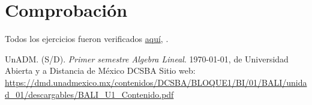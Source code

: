\documentclass[12pt]{article}
\begin{document}
\section*{Comprobaci\'on}
	\par Todos los ejercicios fueron verificados \href{https://github.com/BenchHPZ/UnADM-Biotecnologia/blob/master/B1-1/AL/Actividades/BALI_U2_A2_BERC.ipynb}{aqu\'i}, .



\newpage
\begin{thebibliography}{X}
	 UnADM. (S/D). \emph{Primer semestre Algebra Lineal}. \today, de Universidad Abierta y a Distancia de México \textbar{} DCSBA
Sitio web:
\url{https://dmd.unadmexico.mx/contenidos/DCSBA/BLOQUE1/BI/01/BALI/unidad_01/descargables/BALI_U1_Contenido.pdf}
\end{thebibliography}
\end{document}
